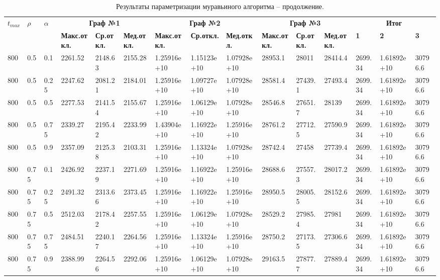 \begin{table}[!htbp]
	\tiny
	\caption{Результаты параметризации муравьиного алгоритма -- продолжение.}
	\label{par_table1}
	\begin{tabularx}{\textwidth}{|p{0.4cm}|*{2}{p{0.2cm}|}*{12}{X|}}
		\hline
		\multirow{2}{3cm}{$t_{max}$} & 
		\multirow{2}{3cm}{$\rho$} & 
		\multirow{2}{3cm}{$\alpha$} & 
		\multicolumn{3}{c|}{\textbf{Граф №1}} & 
		\multicolumn{3}{c|}{\textbf{Граф №2}} & 
		\multicolumn{3}{c|}{\textbf{Граф №3}} & 
		\multicolumn{3}{c|}{\textbf{Итог}}
		\\\cline{4-15}
		& & & 
		\textbf{Макс.откл.} & \textbf{Ср.откл.} & \textbf{Мед.откл.} & 
		\textbf{Макс.откл.} & \textbf{Ср.откл.} & \textbf{Мед.откл.} & 
		\textbf{Макс.откл.} & \textbf{Ср.откл.} & \textbf{Мед.откл.} & 
		\textbf{1} & \textbf{2} & \textbf{3} 
		\\\hline
800&0.5&0.1&2261.52&2148.63&2155.28&1.25916e+10&1.15123e+10&1.07928e+10&28953.1&28011&28414.4&2699.34&1.61892e+10&30796.6\\\hline
800&0.5&0.25&2247.62&2081.21&2184.01&1.25916e+10&1.09727e+10&1.07928e+10&28581.4&27439.1&27493.4&2699.34&1.61892e+10&30796.6\\\hline
800&0.5&0.5&2277.53&2141.54&2155.67&1.25916e+10&1.06129e+10&1.07928e+10&28546.8&27651.7&28139&2699.34&1.61892e+10&30796.6\\\hline
800&0.5&0.75&2339.27&2195.42&2233.99&1.43904e+10&1.16922e+10&1.25916e+10&28761.2&27712.5&27590.9&2699.34&1.61892e+10&30796.6\\\hline
800&0.5&0.9&2357.09&2125.38&2103.31&1.25916e+10&1.13324e+10&1.07928e+10&28742.4&27458&27739.4&2699.34&1.61892e+10&30796.6\\\hline
800&0.75&0.1&2426.92&2237.19&2271.69&1.25916e+10&1.16922e+10&1.25916e+10&28688.6&27557.3&28017.2&2699.34&1.61892e+10&30796.6\\\hline
800&0.75&0.25&2491.32&2313.66&2373.45&1.25916e+10&1.16922e+10&1.25916e+10&28950.5&28005.5&28152.6&2699.34&1.61892e+10&30796.6\\\hline
800&0.75&0.5&2512.03&2178.42&2257.55&1.25916e+10&1.06129e+10&1.07928e+10&28529.2&27985.4&27981&2699.34&1.61892e+10&30796.6\\\hline
800&0.75&0.75&2484.51&2240.17&2264.56&1.25916e+10&1.13324e+10&1.25916e+10&28750.2&27173.5&27306.6&2699.34&1.61892e+10&30796.6\\\hline
800&0.75&0.9&2388.99&2264.56&2292.06&1.25916e+10&1.06129e+10&1.07928e+10&29163.5&27877.7&27889.4&2699.34&1.61892e+10&30796.6\\\hline

\end{tabularx}
\end{table}
